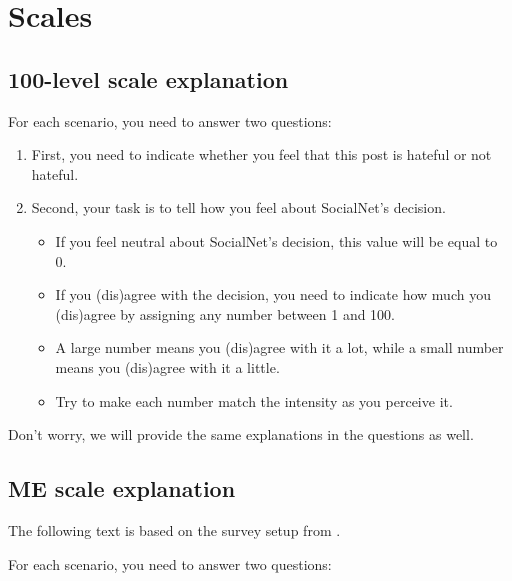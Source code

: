 \section{Scales}
\subsection{100-level scale explanation}
For each scenario, you need to answer two questions:
\begin{enumerate}
    \item First, you need to indicate whether you feel that this post is hateful or not hateful.
    \item Second, your task is to tell how you feel about SocialNet's decision.
          \begin{itemize}
              \item If you feel neutral about SocialNet's decision, this value will be equal to 0.
              \item If you (dis)agree with the decision, you need to indicate how much you (dis)agree by assigning any number between 1 and 100.
              \item A large number means you (dis)agree with it a lot, while a small number means you (dis)agree with it a little.
              \item Try to make each number match the intensity as you perceive it.
          \end{itemize}
\end{enumerate}

\begin{flushleft}
    Don't worry, we will provide the same explanations in the questions as well.
\end{flushleft}

\subsection{ME scale explanation}
The following text is based on the survey setup from \citet{moskowitz1977magnitude}.\\

\begin{flushleft}
    For each scenario, you need to answer two questions:
\end{flushleft}

